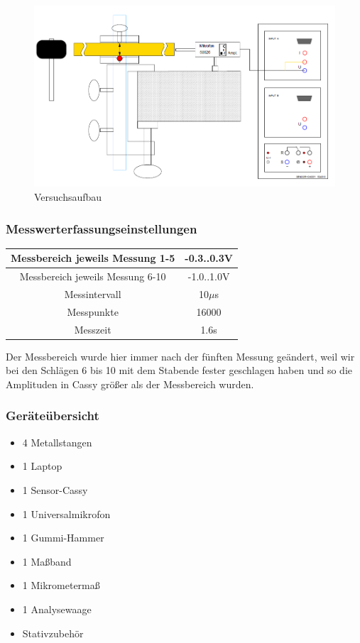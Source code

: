 \documentclass[12pt,a4paper]{article}
\begin{document}
\begin{figure}[H]
\centering
\includegraphics[scale=0.6]{Bilder/Versuchsaufbau_Skript.PNG}
\caption{Versuchsaufbau}
\label{Stange}
\end{figure}


\subsubsection{Messwerterfassungseinstellungen}
\begin{center}
\begin{tabular}{c|c}
Messbereich jeweils Messung 1-5 & -0.3..0.3V\\ 
\hline
Messbereich jeweils Messung 6-10 & -1.0..1.0V\\ 
\hline
Messintervall & 10$\mu$s \\ 
\hline
Messpunkte & 16000 \\ 
\hline
Messzeit & 1.6s \\ 
\end{tabular} 
\end{center}
Der Messbereich wurde hier immer nach der fünften Messung geändert, weil wir bei den Schlägen 6 bis 10 mit dem Stabende fester geschlagen haben und so die Amplituden in Cassy größer als der Messbereich wurden.
\subsubsection{Geräteübersicht}
\begin{itemize}
\item 4 Metallstangen
\item 1 Laptop
\item 1 Sensor-Cassy
\item 1 Universalmikrofon
\item 1 Gummi-Hammer
\item 1 Maßband
\item 1 Mikrometermaß
\item 1 Analysewaage
\item Stativzubehör
\end{itemize}
\end{document}
